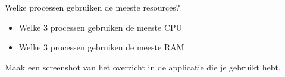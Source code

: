Welke processen gebruiken de meeste resources?
\begin{itemize}
\item Welke 3 processen gebruiken de meeste CPU
\item Welke 3 processen gebruiken de meeste RAM
\end{itemize}
Maak een screenshot van het overzicht in de applicatie die je gebruikt hebt.

